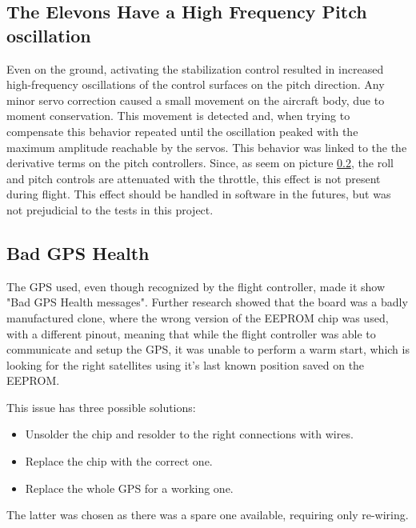 \subsection{The Elevons Have a High Frequency Pitch oscillation}
Even on the ground, activating the stabilization control resulted in increased high-frequency oscillations of the control surfaces on the pitch direction.
%
Any minor servo correction caused a small movement on the aircraft body, due to moment conservation. This movement is detected and, when trying to compensate this behavior repeated until the oscillation peaked with the maximum amplitude reachable by the servos.
%
This behavior was linked to the the derivative terms on the pitch controllers.
%
Since, as seem on picture 
\ref{}, the roll and pitch controls are attenuated with the throttle, this effect is not present during flight. This effect should be handled in software in the futures, but was not prejudicial to the tests in this project.

\subsection{Bad GPS Health}
The GPS used, even though recognized by the flight controller, made it show "Bad GPS Health messages". Further research showed that the board was a badly manufactured clone\cite{badgps}, where the wrong version of the EEPROM chip was used, with a different pinout, meaning that while the flight controller was able to communicate and setup the GPS, it was unable to perform a warm start, which is looking for the right satellites using it's last known position saved on the EEPROM.

This issue has three possible solutions:
\begin{itemize}
\item Unsolder the chip and resolder to the right connections with wires.
\item Replace the chip with the correct one.
\item Replace the whole GPS for a working one.
\end{itemize}

The latter was chosen as there was a spare one available, requiring only re-wiring.